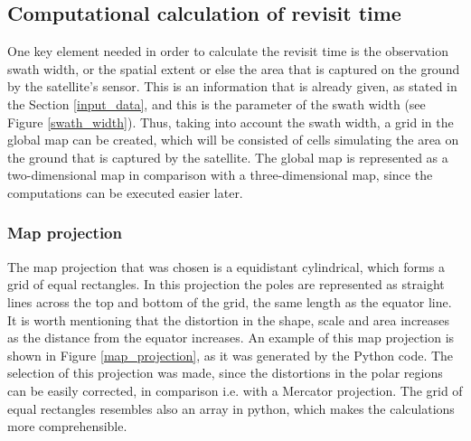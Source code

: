 
\bigskip
\subsection{Computational calculation of revisit time}
\bigskip

One key element needed in order to calculate the revisit time is the observation swath width, or the spatial extent or else the area that is captured on the ground by the satellite's sensor. This is an information that is already given, as stated in the Section \ref{input_data}, and this is the parameter of the swath width (see Figure \ref{swath_width}). Thus, taking into account the swath width, a grid in the global map can be created, which will be consisted of cells simulating the area on the ground that is captured by the satellite. The global map is represented as a two-dimensional map in comparison with a three-dimensional map, since the computations can be executed easier later.

\bigskip
\subsubsection{Map projection}
\bigskip

The map projection that was chosen is a equidistant cylindrical, which forms a grid of equal rectangles. In this projection the poles are represented as straight lines across the top and bottom of the grid, the same length as the equator line. It is worth mentioning that the distortion in the shape, scale and area increases as the distance from the equator increases. \cite{Lapaine} An example of this map projection is shown in Figure \ref{map_projection}, as it was generated by the Python code. The selection of this projection was made, since the distortions in the polar regions can be easily corrected, in comparison i.e. with a Mercator projection. The grid of equal rectangles resembles also an array in python, which makes the calculations more comprehensible.

